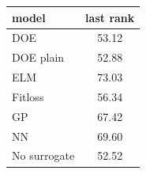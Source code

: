 \begin{tabular}{|lc|}
\hline
model & last rank\\
\hline
DOE & 53.12 \\
DOE plain & 52.88 \\
ELM & 73.03 \\
Fitloss & 56.34 \\
GP & 67.42 \\
NN & 69.60 \\
No surrogate & 52.52 \\
\hline
\end{tabular}
